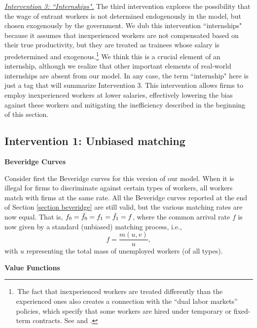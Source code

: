 \documentclass[12pt]{article} %
\theoremstyle{definition}
\begin{document}
\medskip

\underline{\textit{Intervention 3: ``Internships".}} The third intervention explores the possibility that the wage of entrant workers is not determined endogenously in the model, but chosen exogenously by the government. We dub this intervention ``internships" because it assumes that inexperienced workers are not compensated based on their true productivity, but they are treated as trainees whose salary is predetermined and exogenous.\footnote{\,The fact that inexperienced workers are treated differently than the experienced ones also creates a connection with the ``dual labor markets'' policies, which specify that some workers are hired under temporary or fixed-term contracts. See \cite{bentolila2020dual} and \cite{cahuc2024micro}.} We think this is a crucial element of an internship, although we realize that other important elements of real-world internships are absent from our model. In any case, the term ``internship" here is just a tag that will summarize Intervention 3. This intervention allows firms to employ inexperienced workers at lower salaries, effectively lowering the bias against these workers and mitigating the inefficiency described in the beginning of this section.  



\subsection{Intervention 1: Unbiased matching}\label{section unbiased matching}

\textbf{Beveridge Curves} 

\noindent Consider first the Beveridge curves for this version of our model. When it is illegal for firms to discriminate against certain types of workers, all workers match with firms at the same rate. All the Beveridge curves reported at the end of Section \ref{section beveridge} are still valid, but the various matching rates are now equal. That is, $f_0=\Tilde{f_0}=f_1=\Tilde{f_1}=f$, where the common arrival rate $f$ is now given by a standard (unbiased) matching process, i.e., 
\begin{equation}
f=\frac{m(u,v)}{u},\label{eq definition of common f} 
\end{equation}with $u$ representing the total mass of unemployed workers (of all types). 


\bigskip 

\noindent \textbf{Value Functions}
\end{document}
